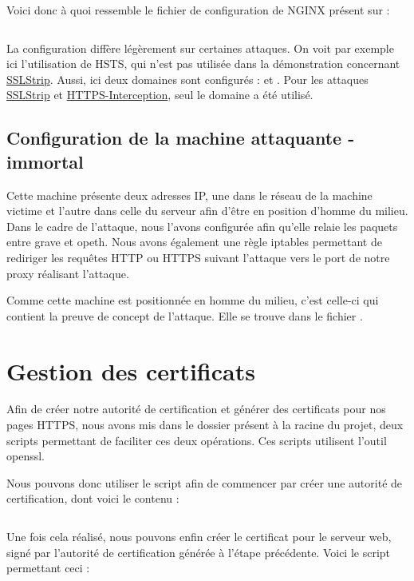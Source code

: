 Voici donc à quoi ressemble le fichier de configuration de NGINX présent sur  :

\inputminted[bgcolor=lbcolor, breaklines]{shell}{../sslstrip2/opeth/nginx.conf}

La configuration diffère légèrement sur certaines attaques. On voit par exemple ici l'utilisation de HSTS, qui n'est pas utilisée dans la démonstration concernant \hyperref[sec:sslstrip]{SSLStrip}. Aussi, ici deux domaines sont configurés :  et . Pour les attaques \hyperref[sec:sslstrip]{SSLStrip} et \hyperref[sec:https-interception]{HTTPS-Interception}, seul le domaine  a été utilisé.

\subsection{Configuration de la machine attaquante - immortal}

Cette machine présente deux adresses IP, une dans le réseau de la machine victime et l'autre dans celle du serveur afin d'être en position d'homme du milieu. Dans le cadre de l'attaque, nous l'avons configurée afin qu'elle relaie les paquets entre grave et opeth. Nous avons également une règle iptables permettant de rediriger les requêtes HTTP ou HTTPS suivant l'attaque vers le port de notre proxy réalisant l'attaque.

Comme cette machine est positionnée en homme du milieu, c'est celle-ci qui contient la preuve de concept de l'attaque. Elle se trouve dans le fichier .

\section{Gestion des certificats}

Afin de créer notre autorité de certification et générer des certificats pour nos pages HTTPS, nous avons mis dans le dossier  présent à la racine du projet, deux scripts permettant de faciliter ces deux opérations. Ces scripts utilisent l'outil openssl.

Nous pouvons donc utiliser le script  afin de commencer par créer une autorité de certification, dont voici le contenu :

\inputminted[bgcolor=lbcolor, breaklines]{shell}{../CA/create-ca.sh}

Une fois cela réalisé, nous pouvons enfin créer le certificat pour le serveur web, signé par l'autorité de certification générée à l'étape précédente. Voici le script permettant ceci :

